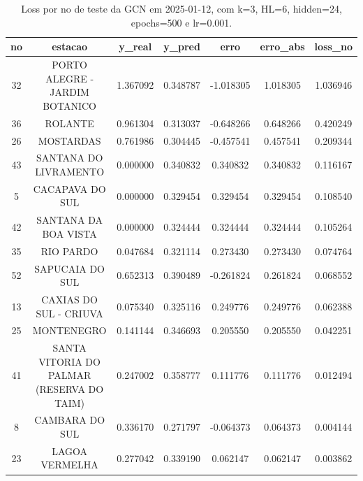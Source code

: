 \begin{table}[h]
\centering
\caption{Loss por no de teste da GCN em 2025-01-12, com k=3, HL=6, hidden=24, epochs=500 e lr=0.001.}
\label{tab:gcn_loss_k3_hl6_h24_e500_d20250112}
\begin{tabular}{ccccccc}
\toprule
no & estacao & y\_real & y\_pred & erro & erro\_abs & loss\_no \\
\midrule
32 & PORTO ALEGRE - JARDIM BOTANICO & 1.367092 & 0.348787 & -1.018305 & 1.018305 & 1.036946 \\
36 & ROLANTE & 0.961304 & 0.313037 & -0.648266 & 0.648266 & 0.420249 \\
26 & MOSTARDAS & 0.761986 & 0.304445 & -0.457541 & 0.457541 & 0.209344 \\
43 & SANTANA DO LIVRAMENTO & 0.000000 & 0.340832 & 0.340832 & 0.340832 & 0.116167 \\
5 & CACAPAVA DO SUL & 0.000000 & 0.329454 & 0.329454 & 0.329454 & 0.108540 \\
42 & SANTANA DA BOA VISTA & 0.000000 & 0.324444 & 0.324444 & 0.324444 & 0.105264 \\
35 & RIO PARDO & 0.047684 & 0.321114 & 0.273430 & 0.273430 & 0.074764 \\
52 & SAPUCAIA DO SUL & 0.652313 & 0.390489 & -0.261824 & 0.261824 & 0.068552 \\
13 & CAXIAS DO SUL - CRIUVA & 0.075340 & 0.325116 & 0.249776 & 0.249776 & 0.062388 \\
25 & MONTENEGRO & 0.141144 & 0.346693 & 0.205550 & 0.205550 & 0.042251 \\
41 & SANTA VITORIA DO PALMAR (RESERVA DO TAIM) & 0.247002 & 0.358777 & 0.111776 & 0.111776 & 0.012494 \\
8 & CAMBARA DO SUL & 0.336170 & 0.271797 & -0.064373 & 0.064373 & 0.004144 \\
23 & LAGOA VERMELHA & 0.277042 & 0.339190 & 0.062147 & 0.062147 & 0.003862 \\
\bottomrule
\end{tabular}
\end{table}
